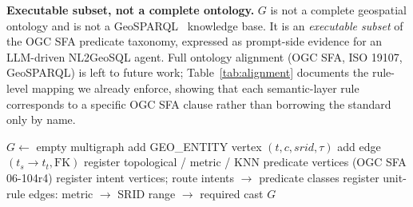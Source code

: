 \documentclass[11pt]{article}
\begin{document}
\noindent\textbf{Executable subset, not a complete ontology.} $G$ is not a
complete geospatial ontology and is not a GeoSPARQL~\citep{ogcgeosparql}
knowledge base. It is an \emph{executable subset} of the OGC SFA predicate
taxonomy, expressed as prompt-side evidence for an LLM-driven NL2GeoSQL
agent. Full ontology alignment (OGC SFA, ISO 19107, GeoSPARQL) is left to
future work; Table~\ref{tab:alignment} documents the rule-level mapping
we already enforce, showing that each semantic-layer rule corresponds to a
specific OGC SFA clause rather than borrowing the standard only by name.

\begin{algorithm}[t]
\caption{\textsc{BuildSemanticGraph}($\mathit{schema}, \mathit{prefix}$)}
\label{alg:build-graph}
\begin{algorithmic}[1]
\STATE $G \gets$ empty multigraph
    \STATE add GEO\_ENTITY vertex $(t, c, \mathit{srid}, \tau)$
  \ENDIF
\ENDFOR
{}
  \STATE add edge $(t_s \to t_t, \text{FK})$
\ENDFOR
\STATE register topological / metric / KNN predicate vertices (OGC SFA 06-104r4)
\STATE register intent vertices; route intents $\to$ predicate classes
\STATE register unit-rule edges: metric $\to$ SRID range $\to$ required cast
\RETURN $G$
\end{algorithmic}
\end{algorithm}
\end{document}
